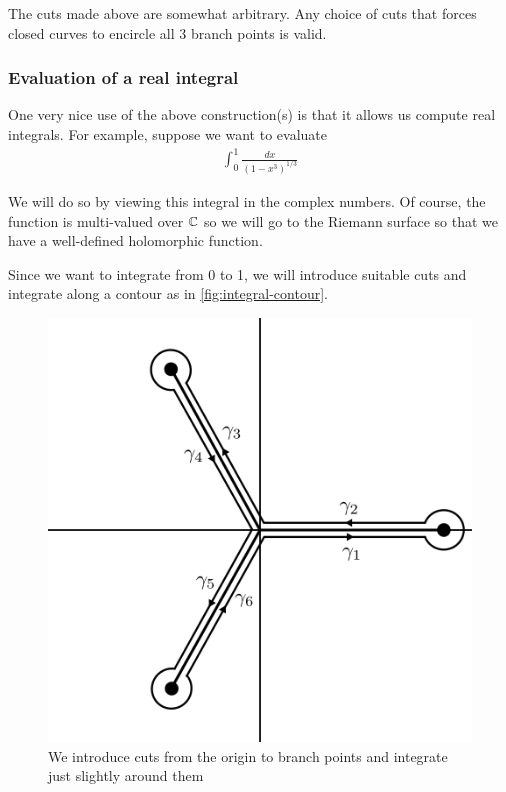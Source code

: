 \begin{remark}
    The cuts made above are somewhat arbitrary. Any choice of cuts that forces closed curves to encircle all 3 branch points is valid.
\end{remark}



\subsubsection{Evaluation of a real integral}
One very nice use of the above construction(s) is that it allows us compute real integrals. For example, suppose we want to evaluate 
\begin{align*}
    \int_0^1 \frac{dx}{(1 - x^3)^{1/3}}
\end{align*}

We will do so by viewing this integral in the complex numbers. Of course, the function is multi-valued over $\mathbb{C}$ so we will go to the Riemann surface so that we have a well-defined holomorphic function. 

Since we want to integrate from 0 to 1, we will introduce suitable cuts and integrate along a contour as in \autoref{fig:integral-contour}. 
\begin{figure}[ht]
    \centering
    \includegraphics{Images/integral_contour.png}
    \caption{We introduce cuts from the origin to branch points and integrate just slightly around them}
    \label{fig:integral-contour}
\end{figure}

